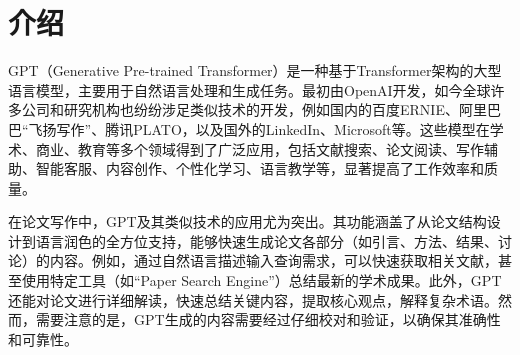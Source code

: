\section{介绍}\label{sec:intro}
GPT（Generative Pre-trained Transformer）是一种基于Transformer架构的大型语言模型，主要用于自然语言处理和生成任务。最初由OpenAI开发，如今全球许多公司和研究机构也纷纷涉足类似技术的开发，例如国内的百度ERNIE、阿里巴巴“飞扬写作”、腾讯PLATO，以及国外的LinkedIn、Microsoft等。这些模型在学术、商业、教育等多个领域得到了广泛应用，包括文献搜索、论文阅读、写作辅助、智能客服、内容创作、个性化学习、语言教学等，显著提高了工作效率和质量。

在论文写作中，GPT及其类似技术的应用尤为突出。其功能涵盖了从论文结构设计到语言润色的全方位支持，能够快速生成论文各部分（如引言、方法、结果、讨论）的内容。例如，通过自然语言描述输入查询需求，可以快速获取相关文献，甚至使用特定工具（如“Paper Search Engine”）总结最新的学术成果。此外，GPT还能对论文进行详细解读，快速总结关键内容，提取核心观点，解释复杂术语。然而，需要注意的是，GPT生成的内容需要经过仔细校对和验证，以确保其准确性和可靠性。